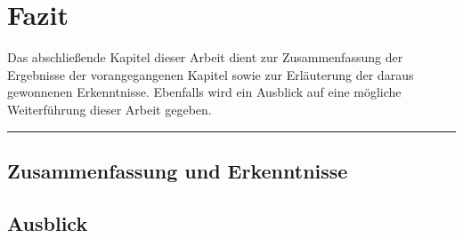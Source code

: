 
\chapter{Fazit}
\label{conclusion}

Das abschließende Kapitel dieser Arbeit dient zur Zusammenfassung der Ergebnisse der vorangegangenen Kapitel sowie zur Erläuterung der daraus gewonnenen Erkenntnisse. Ebenfalls wird ein Ausblick auf eine mögliche Weiterführung dieser Arbeit gegeben.
\\
\hrule

\section{Zusammenfassung und Erkenntnisse}

\section{Ausblick}

\cleardoublepage